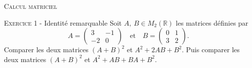 

\newcommand{\mtn}{\mathbb{N}}
\newcommand{\mtns}{\mathbb{N}^*}
\newcommand{\mtz}{\mathbb{Z}}
\newcommand{\mtr}{\mathbb{R}}
\newcommand{\mtk}{\mathbb{K}}
\newcommand{\mtq}{\mathbb{Q}}
\newcommand{\mtc}{\mathbb{C}}
\newcommand{\mch}{\mathcal{H}}
\newcommand{\mcp}{\mathcal{P}}
\newcommand{\mcb}{\mathcal{B}}
\newcommand{\mcl}{\mathcal{L}}
\newcommand{\mcm}{\mathcal{M}}
\newcommand{\mcc}{\mathcal{C}}
\newcommand{\mcmn}{\mathcal{M}}
\newcommand{\mcmnr}{\mathcal{M}_n(\mtr)}
\newcommand{\mcmnk}{\mathcal{M}_n(\mtk)}
\newcommand{\mcsn}{\mathcal{S}_n}
\newcommand{\mcs}{\mathcal{S}}
\newcommand{\mcd}{\mathcal{D}}
\newcommand{\mcsns}{\mathcal{S}_n^{++}}
\newcommand{\glnk}{GL_n(\mtk)}
\newcommand{\mnr}{\mathcal{M}_n(\mtr)}
\newcommand{\veps}{\varepsilon}
\newcommand{\mcu}{\mathcal{U}}
\newcommand{\mcun}{\mcu_n}
\newcommand{\dis}{\displaystyle}
\newcommand{\croouv}{[\![}
\newcommand{\crofer}{]\!]}
\newcommand{\rab}{\mathcal{R}(a,b)}
\newcommand{\pss}[2]{\langle #1,#2\rangle}

\DeclareMathOperator{\ch}{ch}
\DeclareMathOperator{\sh}{sh}
\DeclareMathOperator{\vect}{vect}
\DeclareMathOperator{\card}{card}
\DeclareMathOperator{\comat}{comat}
\DeclareMathOperator{\imv}{Im}
\DeclareMathOperator{\rang}{rg}
\DeclareMathOperator{\Fr}{Fr}
\DeclareMathOperator{\diam}{diam}
\DeclareMathOperator{\supp}{supp}

 

\begin{center}\textsc{{\huge Calcul matriciel}}\end{center}


\vskip0.3cm\noindent\textsc{Exercice 1} - Identité remarquable
\vskip0.2cm
Soit $A,\ B\in M_{2}(\mathbb R)$ les matrices définies par
\begin{equation*}
	 A=\left(\begin{array}{cc} 3 & -1\\-2&0 \end{array} \right)
	\quad \textrm{et} \quad B=\left(\begin{array}{cc} 0 & 1\\3&2 \end{array} \right).
\end{equation*}
Comparer les deux matrices $(A+B)^2$ et $A^2+2AB+B^2$. Puis comparer les deux matrices $(A+B)^2$ et $A^2+AB+BA+B^2$.




